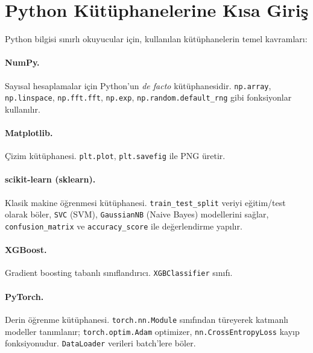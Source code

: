 \documentclass[11pt,a4paper]{article}
\begin{document}
\section{Python Kütüphanelerine Kısa Giriş}
Python bilgisi sınırlı okuyucular için, kullanılan kütüphanelerin temel kavramları:

\paragraph{NumPy.} Sayısal hesaplamalar için Python'un \emph{de facto} kütüphanesidir.
\texttt{np.array}, \texttt{np.linspace}, \texttt{np.fft.fft}, \texttt{np.exp},
\texttt{np.random.default\_rng} gibi fonksiyonlar kullanılır.

\paragraph{Matplotlib.} Çizim kütüphanesi. \texttt{plt.plot}, \texttt{plt.savefig} ile PNG üretir.

\paragraph{scikit-learn (sklearn).} Klasik makine öğrenmesi kütüphanesi. \texttt{train\_test\_split}
veriyi eğitim/test olarak böler, \texttt{SVC} (SVM), \texttt{GaussianNB} (Naive Bayes) modellerini
sağlar, \texttt{confusion\_matrix} ve \texttt{accuracy\_score} ile değerlendirme yapılır.

\paragraph{XGBoost.} Gradient boosting tabanlı sınıflandırıcı. \texttt{XGBClassifier} sınıfı.

\paragraph{PyTorch.} Derin öğrenme kütüphanesi. \texttt{torch.nn.Module} sınıfından türeyerek
katmanlı modeller tanımlanır; \texttt{torch.optim.Adam} optimizer, \texttt{nn.CrossEntropyLoss}
kayıp fonksiyonudur. \texttt{DataLoader} verileri batch'lere böler.

\end{document}
